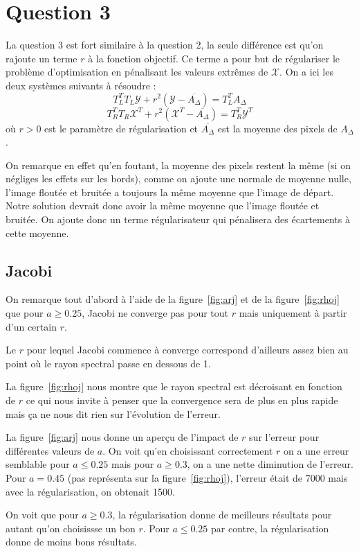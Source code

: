 \section{Question 3}
La question 3 est fort similaire à la question 2, la seule différence est qu'on rajoute un terme $r$ à la fonction objectif. Ce terme a pour but de régulariser le problème d'optimisation en pénalisant les valeurs extrêmes de $\mathcal{X}$. On a ici les deux systèmes suivants à résoudre : $$T_{L}^{T} T_L \mathcal{Y} + r^2 (\mathcal{Y}-\overline{A_{\Delta}}) = T_{L}^{T} A_{\Delta}$$ $$T_{R}^{T} T_R \mathcal{X}^{T} + r^2 (\mathcal{X}^{T}-\overline{A_{\Delta}}) = T_{R}^{T} \mathcal{Y}^{T}$$ où $r>0$ est le paramètre de régularisation et $\overline{A_{\Delta}}$ est la moyenne des pixels de $A_{\Delta}$.

On remarque en effet qu'en foutant, la moyenne des pixels restent la même (si on négliges les effets sur les bords),
comme on ajoute une normale de moyenne nulle, l'image floutée et bruitée a toujours la même moyenne que l'image de départ.
Notre solution devrait donc avoir la même moyenne que l'image floutée et bruitée.
On ajoute donc un terme régularisateur qui pénalisera des écartements à cette moyenne.

\subsection{Jacobi}
On remarque tout d'abord à l'aide de la figure~\ref{fig:arj}
et de la figure~\ref{fig:rhoj} que pour $a \geq 0.25$,
Jacobi ne converge pas pour tout $r$ mais uniquement à partir
d'un certain $r$.

Le $r$ pour lequel Jacobi commence à converge correspond d'ailleurs
assez bien au point où le rayon spectral passe en dessous de 1.

La figure~\ref{fig:rhoj} nous montre que le rayon spectral est
décroisant en fonction de $r$ ce qui nous invite à penser que
la convergence sera de plus en plus rapide mais ça ne nous
dit rien sur l'évolution de l'erreur.

La figure~\ref{fig:arj} nous donne un aperçu de l'impact de $r$
sur l'erreur pour différentes valeurs de $a$.
On voit qu'en choisissant correctement $r$ on a une erreur semblable
pour $a \leq 0.25$ mais pour $a \geq 0.3$, on a une nette
diminution de l'erreur.
Pour $a = 0.45$ (pas représenta sur la figure~\ref{fig:rhoj}),
l'erreur était de 7000 mais avec la régularisation, on obtenait
1500.

On voit que pour $a \geq 0.3$, la régularisation donne de meilleurs résultats
pour autant qu'on choisissse un bon $r$.
Pour $a \leq 0.25$ par contre, la régularisation donne de moins bons résultats.

